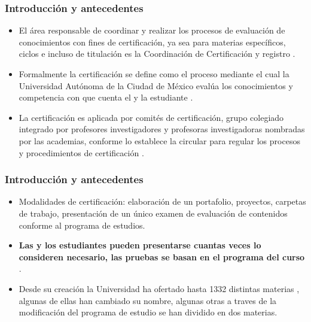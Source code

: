 \documentclass[xcolor=dvipsnames]{beamer}
\begin{document}
\begin{frame}\frametitle{Introducci\'on y antecedentes}
\begin{itemize}

\item El \'area responsable de coordinar y realizar los procesos de evaluaci\'on de conocimientos con fines de certificaci\'on, ya sea para materias espec\'ificos, ciclos e incluso de titulaci\'on es la Coordinaci\'on de Certificaci\'on y registro \cite{ProyectoEducativo}.

\item Formalmente la certificaci\'on se define como el proceso mediante el cual la Universidad Aut\'onoma de la Ciudad de M\'exico eval\'ua los conocimientos y competencia con que cuenta el y la estudiante \cite{CircularCertificacion}.


\item La certificaci\'on es aplicada por comit\'es de certificaci\'on, grupo colegiado integrado por profesores investigadores y profesoras investigadoras  nombradas por las academias,  conforme lo establece la circular para regular los procesos y procedimientos de certificaci\'on \cite{CircularCertificacion}.


\end{itemize}

\end{frame}


\begin{frame}\frametitle{Introducci\'on y antecedentes}
\begin{itemize}

\item Modalidades de certificaci\'on: elaboraci\'on de un portafolio,  proyectos, carpetas de trabajo,  presentaci\'on de un \'unico examen de evaluaci\'on de contenidos conforme al programa de estudios.



\item 
\textbf{Las y los estudiantes pueden presentarse cuantas veces lo consideren necesario, las pruebas se basan en el programa del curso \cite{Doc3}}.

\item Desde su creaci\'on la Universidad ha ofertado hasta 1332 distintas materias , algunas de ellas han cambiado su nombre, algunas otras a traves de la modificaci\'on del programa de estudio se han dividido en dos materias.

\end{itemize}

\end{frame}
\end{document}
